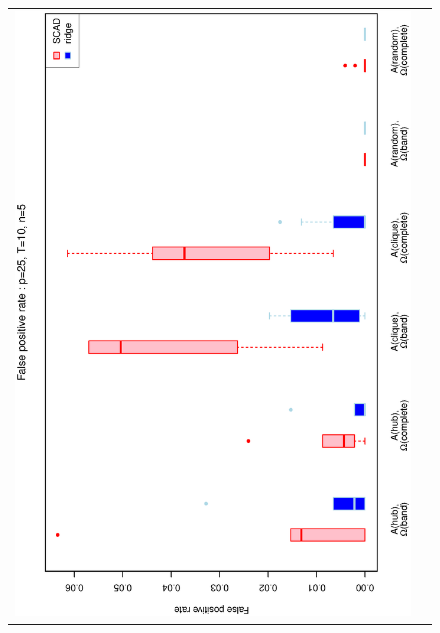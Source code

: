 \begin{figure}[h!]
\centering
\begin{tabular}{cc}
\includegraphics[scale=0.45,angle=270]{ROCfpr25T10N5_25.eps}
\\

\end{tabular}
\end{figure}
